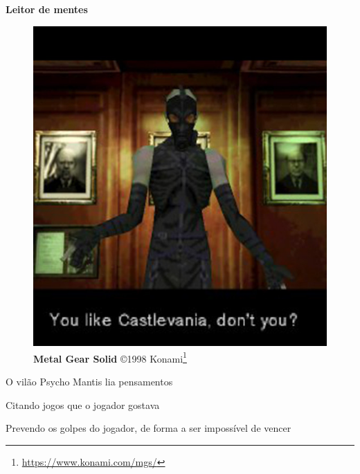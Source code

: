 \expandafter\documentclass\expandafter[table, usenames, svgnames, dvipsnames, \classopts]{beamer}
\begin{document}
\begin{frame}{\textbf{Leitor de mentes}}

	\begin{figure}
		\centering
		\includegraphics[height=0.4\paperheight]{metal-gear}
		\caption{\tiny \textbf{Metal Gear Solid} \copyright{1998} Konami\footnote{\url{https://www.konami.com/mgs/}}}
	\end{figure}

	\vspace{-1em}

	\begin{outline}
		\1 O vilão Psycho Mantis lia pensamentos
		
		\1 Citando jogos que o jogador gostava

		\1 Prevendo os golpes do jogador, de forma a ser impossível de vencer
	\end{outline}

\end{frame}
\end{document}
